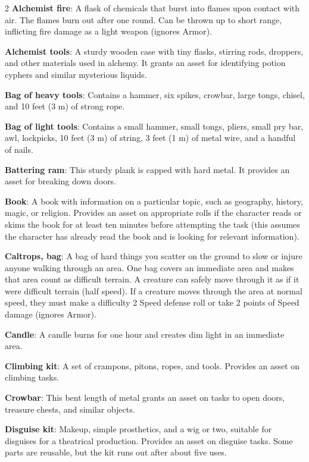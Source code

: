 \begin{multicols}{2}
\textbf{Alchemist fire}: A flask of chemicals that burst into flames upon contact with air. The flames burn out after one round. Can be thrown up to short range, inflicting fire damage as a light weapon (ignores Armor). 

\textbf{Alchemist tools}: A sturdy wooden case with tiny flasks, stirring rods, droppers, and other materials used in alchemy. It grants an asset for identifying potion cyphers and similar mysterious liquids. 

\textbf{Bag of heavy tools}: Contains a hammer, six spikes, crowbar, large tongs, chisel, and 10 feet (3 m) of strong rope. 

\textbf{Bag of light tools}: Contains a small hammer, small tongs, pliers, small pry bar, awl, lockpicks, 10 feet (3 m) of string, 3 feet (1 m) of metal wire, and a handful of nails. 

\textbf{Battering ram}: This sturdy plank is capped with hard metal. It provides an asset for breaking down doors. 

\textbf{Book}: A book with information on a particular topic, such as geography, history, magic, or religion. Provides an asset on appropriate rolls if the character reads or skims the book for at least ten minutes before attempting the task (this assumes the character has already read the book and is looking for relevant information). 

\textbf{Caltrops, bag}: A bag of hard things you scatter on the ground to slow or injure anyone walking through an area. One bag covers an immediate area and makes that area count as difficult terrain. A creature can safely move through it as if it were difficult terrain (half speed). If a creature moves through the area at normal speed, they must make a difficulty 2 Speed defense roll or take 2 points of Speed damage (ignores Armor).

\textbf{Candle}: A candle burns for one hour and creates dim light in an immediate area. 

\textbf{Climbing kit}: A set of crampons, pitons, ropes, and tools. Provides an asset on climbing tasks. 

\textbf{Crowbar}: This bent length of metal grants an asset on tasks to open doors, treasure chests, and similar objects. 

\textbf{Disguise kit}: Makeup, simple prosthetics, and a wig or two, suitable for disguises for a theatrical production. Provides an asset on disguise tasks. Some parts are reusable, but the kit runs out after about five uses. 


\end{multicols}
